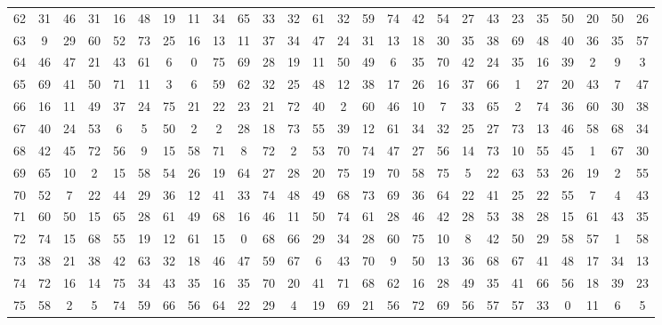 \begin{table}
\begin{tabular}{c c c c c c c c c c c c c c c c c c c c c c c c c c }
62 & 31 & 46 & 31 & 16 & 48 & 19 & 11 & 34 & 65 & 33 & 32 & 61 & 32 & 59 & 74 & 42 & 54 & 27 & 43 & 23 & 35 & 50 & 20 & 50 & 26 \\
63 & 9 & 29 & 60 & 52 & 73 & 25 & 16 & 13 & 11 & 37 & 34 & 47 & 24 & 31 & 13 & 18 & 30 & 35 & 38 & 69 & 48 & 40 & 36 & 35 & 57 \\
64 & 46 & 47 & 21 & 43 & 61 & 6 & 0 & 75 & 69 & 28 & 19 & 11 & 50 & 49 & 6 & 35 & 70 & 42 & 24 & 35 & 16 & 39 & 2 & 9 & 3 \\
65 & 69 & 41 & 50 & 71 & 11 & 3 & 6 & 59 & 62 & 32 & 25 & 48 & 12 & 38 & 17 & 26 & 16 & 37 & 66 & 1 & 27 & 20 & 43 & 7 & 47 \\
66 & 16 & 11 & 49 & 37 & 24 & 75 & 21 & 22 & 23 & 21 & 72 & 40 & 2 & 60 & 46 & 10 & 7 & 33 & 65 & 2 & 74 & 36 & 60 & 30 & 38 \\
67 & 40 & 24 & 53 & 6 & 5 & 50 & 2 & 2 & 28 & 18 & 73 & 55 & 39 & 12 & 61 & 34 & 32 & 25 & 27 & 73 & 13 & 46 & 58 & 68 & 34 \\
68 & 42 & 45 & 72 & 56 & 9 & 15 & 58 & 71 & 8 & 72 & 2 & 53 & 70 & 74 & 47 & 27 & 56 & 14 & 73 & 10 & 55 & 45 & 1 & 67 & 30 \\
69 & 65 & 10 & 2 & 15 & 58 & 54 & 26 & 19 & 64 & 27 & 28 & 20 & 75 & 19 & 70 & 58 & 75 & 5 & 22 & 63 & 53 & 26 & 19 & 2 & 55 \\
70 & 52 & 7 & 22 & 44 & 29 & 36 & 12 & 41 & 33 & 74 & 48 & 49 & 68 & 73 & 69 & 36 & 64 & 22 & 41 & 25 & 22 & 55 & 7 & 4 & 43 \\
71 & 60 & 50 & 15 & 65 & 28 & 61 & 49 & 68 & 16 & 46 & 11 & 50 & 74 & 61 & 28 & 46 & 42 & 28 & 53 & 38 & 28 & 15 & 61 & 43 & 35 \\
72 & 74 & 15 & 68 & 55 & 19 & 12 & 61 & 15 & 0 & 68 & 66 & 29 & 34 & 28 & 60 & 75 & 10 & 8 & 42 & 50 & 29 & 58 & 57 & 1 & 58 \\
73 & 38 & 21 & 38 & 42 & 63 & 32 & 18 & 46 & 47 & 59 & 67 & 6 & 43 & 70 & 9 & 50 & 13 & 36 & 68 & 67 & 41 & 48 & 17 & 34 & 13 \\
74 & 72 & 16 & 14 & 75 & 34 & 43 & 35 & 16 & 35 & 70 & 20 & 41 & 71 & 68 & 62 & 16 & 28 & 49 & 35 & 41 & 66 & 56 & 18 & 39 & 23 \\
75 & 58 & 2 & 5 & 74 & 59 & 66 & 56 & 64 & 22 & 29 & 4 & 19 & 69 & 21 & 56 & 72 & 69 & 56 & 57 & 57 & 33 & 0 & 11 & 6 & 5 \\
\hline
\end{tabular}
\end{table}